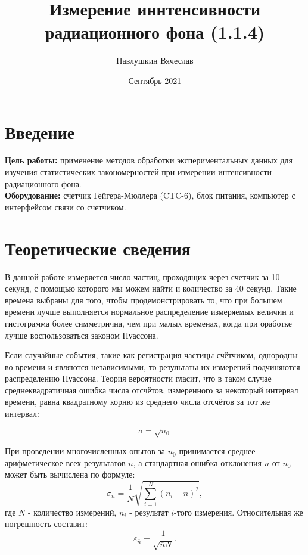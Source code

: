\documentclass[a4paper, 12pt]{article}
\title{\textbf{Измерение иннтенсивности радиационного фона (1.1.4)}}
\author{Павлушкин Вячеслав}
\date{Сентябрь 2021}
\begin{document}
	
	\maketitle
	
	\section{Введение}
	
	\textbf{Цель работы:} применение методов обработки экспериментальных данных для изучения статистических закономерностей при измерении интенсивности радиационного фона.
	\bigskip\\
	\textbf{Оборудование:} счетчик Гейгера-Мюллера (CTC-6), блок питания, компьютер с интерфейсом связи со счетчиком.
	
	\section{Теоретические сведения}
	
	В данной работе измеряется число частиц, проходящих через счетчик за 10 секунд, с помощью которого мы можем найти и количество за 40 секунд. Такие времена выбраны для того, чтобы продемонстрировать то, что при большем времени лучше выполняется нормальное распределение измеряемых величин и гистограмма более симметрична, чем при малых временах, когда при оработке лучше воспользоваться законом Пуассона.
	
	Если случайные события, такие как регистрация частицы счётчиком, однородны во времени и являются независимыми, то результаты их измерений подчиняются распределению Пуассона. Теория вероятности гласит, что в таком случае среднеквадратичная ошибка числа отсчётов, измеренного за некоторый интервал времени, равна квадратному корню из среднего числа отсчётов за тот же интервал:
	
	\begin{equation}
		\sigma = \sqrt{n_0}
	\end{equation}
	 
	
	При проведении многочисленных опытов за $n_0$ принимается среднее арифметическое всех результатов $\overline n$, а стандартная ошибка отклонения $\overline n$ от $n_0$ может быть вычислена по формуле:
	\[ \sigma_{\overline n} = \frac{1}{N} \sqrt{\sum_{i=1}^N(n_i - \overline n)^2}, \] где $N$ - количество измерений, $n_i$ - результат $i$-того измерения. Относительная же погрешность составит: \[ \varepsilon_{\overline n} = \frac{1}{\sqrt{\overline n N}}. \] 
	
\end{document}
